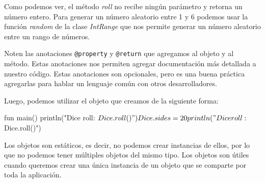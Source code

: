   Como podemos ver, el método \textit{roll} no recibe ningún parámetro y retorna un número entero.
  Para generar un número aleatorio entre 1 y 6 podemos usar la función \textit{random} de la clase
  \textit{IntRange} que nos permite generar un número aleatorio entre un rango de números.

  Noten las anotaciones \texttt{@property} y \texttt{@return} que agregamos al objeto y al método.
  Estas anotaciones nos permiten agregar documentación más detallada a nuestro código.
  Estas anotaciones son opcionales, pero es una buena práctica agregarlas para hablar un lenguaje
  común con otros desarrolladores.
  
  Luego, podemos utilizar el objeto que creamos de la siguiente forma:

  \begin{kotlin}
    fun main() {
      println("Dice roll: ${Dice.roll()}")
      Dice.sides = 20
      println("Dice roll: ${Dice.roll()}")
    }
  \end{kotlin}

  \begin{important}
    Los objetos son estáticos, es decir, no podemos crear instancias de ellos, por lo que no podemos
    tener múltiples objetos del mismo tipo.
    Los objetos son útiles cuando queremos crear una única instancia de un objeto que se comparte
    por toda la aplicación.
  \end{important}